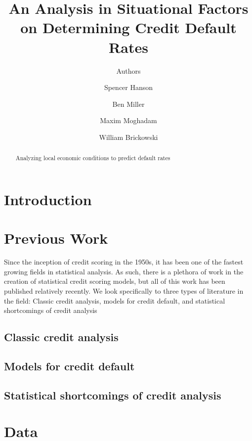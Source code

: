 \documentclass[sigconf]{acmart}
\begin{document}
\title{An Analysis in Situational Factors on Determining Credit Default Rates}
\subtitle{Authors}

\author{Spencer Hanson}
\affiliation{}

\author{Ben Miller}
\affiliation{}

\author{Maxim Moghadam}
\affiliation{}

\author{William Brickowski}
\affiliation{}

\maketitle

\begin{abstract}
Analyzing local economic conditions to predict default rates
\end{abstract}

\section{Introduction}


\section{Previous Work}
Since the inception of credit scoring in the 1950s, it has been one of the fastest growing fields in statistical analysis. As such, there is a plethora of work in the creation of statistical credit scoring models, but all of this work has been published relatively recently. We look specifically to three types of literature in the field: Classic credit analysis, models for credit default, and statistical shortcomings of credit analysis
\subsection{Classic credit analysis}

\subsection{Models for credit default}


\subsection{Statistical shortcomings of credit analysis}

\section{Data}
\end{document}
